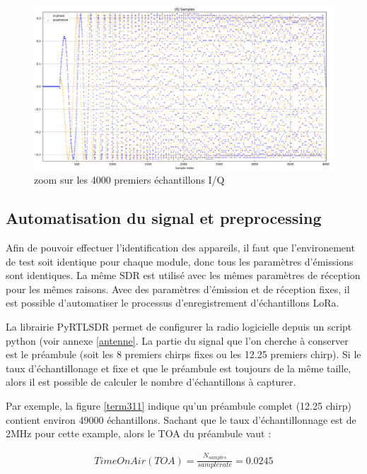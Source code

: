\begin{figure}[h]
\centering

\includegraphics[scale=0.13]{images/iq2.png}
\caption{zoom sur les 4000 premiers échantillons I/Q}\label{term310}
\end{figure}

\subsection{Automatisation du signal et preprocessing}

Afin de pouvoir effectuer l'identification des appareils, il faut que l'environement de test soit identique pour chaque module, donc tous les paramètres d'émissions sont identiques. La même SDR est utilisé avec les mêmes paramètres de réception pour les mêmes raisons. Avec des paramètres d'émission et de réception fixes, il est possible d'automatiser le processus d'enregistrement d'échantillons LoRa.

La librairie PyRTLSDR permet de configurer la radio logicielle depuis un script python (voir annexe \ref{antenne}. La partie du signal que l'on cherche à conserver est le préambule (soit les 8 premiers chirps fixes ou les 12.25 premiers chirp). Si le taux d'échantillonage et fixe et que le préambule est toujours de la même taille, alors il est possible de calculer le nombre d'échantillons à capturer. 

Par exemple, la figure \ref{term311} indique qu'un préambule complet (12.25 chirp) contient environ 49000 échantillons. Sachant que le taux d'échantillonnage est de 2MHz pour cette example, alors le TOA du préambule vaut :

\begin{align}
    Time On Air (TOA) = \frac{N_{samples}}{sample rate} = 0.0245
\end{align}

